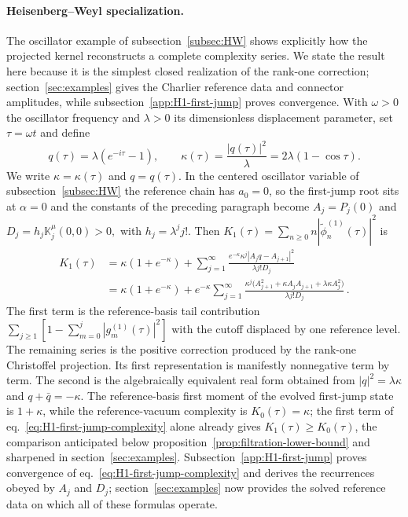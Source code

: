 \documentclass[a4paper,11pt]{article}
\def\ii{i}%
\def\ee{e}%
\theoremstyle{definition}
\theoremstyle{remark}
\newcommand{\ii}{\mathrm i}
\newcommand{\ee}{\mathrm e}
\newcommand{\tphi}{\widetilde\phi}
\begin{document}
\paragraph{Heisenberg--Weyl specialization.}
The oscillator example of subsection~\ref{subsec:HW} shows explicitly how the projected kernel reconstructs a complete complexity series. We state the result here because it is the simplest closed realization of the rank-one correction; section~\ref{sec:examples} gives the Charlier reference data and connector amplitudes, while subsection~\ref{app:H1-first-jump} proves convergence. With $\omega>0$ the oscillator frequency and $\lambda>0$ its dimensionless displacement parameter, set $\tau=\omega t$ and define
\begin{equation}
   q(\tau)
   =
   \lambda(\ee^{-\ii\tau}-1),
   \qquad
   \kappa(\tau)
   =
   \frac{|q(\tau)|^2}{\lambda}
   =
   2\lambda(1-\cos\tau).
   \label{eq:kappa-def-main}
\end{equation}
We write $\kappa=\kappa(\tau)$ and $q=q(\tau)$. In the centered oscillator variable of subsection~\ref{subsec:HW} the reference chain has $a_0=0$, so the first-jump root sits at $\alpha=0$ and the constants of the preceding paragraph become
$
   A_j=P_j(0)
$
and
$
   D_j=h_j\mathbb K_j^\mu(0,0)>0,
$
with
$
   h_j=\lambda^j j!.
$
Then
$
   K_1(\tau)
   =
   \sum_{n\ge0}
   n|\tphi_n^{(1)}(\tau)|^2
$
is
\begin{equation}
\begin{aligned}
   K_1(\tau)
   &=
   \kappa(1+\ee^{-\kappa})
   +
   \sum_{j=1}^{\infty}
   \frac{
      \ee^{-\kappa}\kappa^j
      |A_jq-A_{j+1}|^2}
   {\lambda j!D_j}\\
   &=
   \kappa(1+\ee^{-\kappa})
   +
   \ee^{-\kappa}
   \sum_{j=1}^{\infty}
   \frac{
      \kappa^j
      \bigl(
         A_{j+1}^2
         +\kappa A_jA_{j+1}
         +\lambda\kappa A_j^2
      \bigr)}
   {\lambda j!D_j}\,.
\end{aligned}
   \label{eq:H1-first-jump-complexity}
\end{equation}
The first term is the reference-basis tail contribution
$
   \sum_{j\ge1}
   [1-\sum_{m=0}^{j}|g_m^{(1)}(\tau)|^2]
$
with the cutoff displaced by one reference level. The remaining series is the positive correction produced by the rank-one Christoffel projection. Its first representation is manifestly nonnegative term by term. The second is the algebraically equivalent real form obtained from
$
   |q|^2=\lambda\kappa
$
and
$
   q+\bar q=-\kappa.
$
The reference-basis first moment of the evolved first-jump state is $1+\kappa$, while the reference-vacuum complexity is $K_0(\tau)=\kappa$; the first term of eq.~\eqref{eq:H1-first-jump-complexity} alone already gives $K_1(\tau)\ge K_0(\tau)$, the comparison anticipated below proposition~\ref{prop:filtration-lower-bound} and sharpened in section~\ref{sec:examples}. Subsection~\ref{app:H1-first-jump} proves convergence of eq.~\eqref{eq:H1-first-jump-complexity} and derives the recurrences obeyed by $A_j$ and $D_j$; section~\ref{sec:examples} now provides the solved reference data on which all of these formulas operate.
\end{document}
